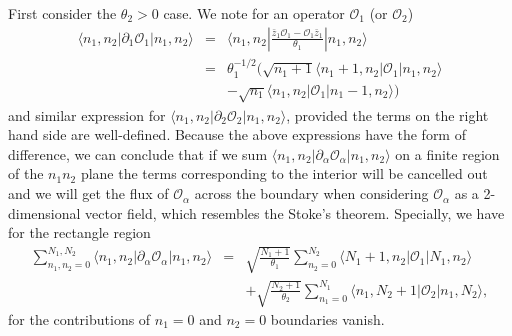 \documentclass[a4paper,a4paper]{article}
\begin{document}
First consider the $\theta _{2}>0$ case. We note for an operator
$\mathcal{O}_{1}$ (or $\mathcal{O}_{2}$)
\begin{eqnarray}
\langle n_{1},n_{2}|\partial _{1}\mathcal{O}_{1}|n_{1},n_{2}\rangle
&=&\langle n_{1},n_{2}|\frac{\bar{z}_{1}\mathcal{O}_{1}-\mathcal{O}_{1}\bar{z%
}_{1}}{\theta _{1}}|n_{1},n_{2}\rangle  \nonumber \\
&=&\theta _{1}^{-1/2}(\sqrt{n_{1}+1}\langle n_{1}+1,n_{2}|\mathcal{O}%
_{1}|n_{1},n_{2}\rangle \label{diff2}\\
&&-\sqrt{n_{1}}\langle n_{1},n_{2}|\mathcal{O}_{1}|n_{1}-1,n_{2}\rangle)
\nonumber
\end{eqnarray}%
and similar expression for $\langle n_{1},n_{2}|\partial _{2}\mathcal{O}%
_{2}|n_{1},n_{2}\rangle $, provided the terms on the right hand
side are well-defined. Because the above expressions have the form
of difference, we can conclude that if we sum $\langle
n_{1},n_{2}|\partial _{\alpha }\mathcal{O}_{\alpha
}|n_{1},n_{2}\rangle $ on a finite region of the $n_{1}n_{2}$
plane the terms corresponding to the interior will be cancelled
out and we will get the flux of $\mathcal{O}_{\alpha }$ across the
boundary when considering $\mathcal{O}_{\alpha }$ as a
2-dimensional vector field, which resembles the Stoke's theorem.
Specially, we have for the
rectangle region%
\begin{eqnarray}
\sum_{n_{1},n_{2}=0}^{N_{1},N_{2}}\langle n_{1},n_{2}|\partial _{\alpha }%
\mathcal{O}_{\alpha }|n_{1},n_{2}\rangle &=&\sqrt{\frac{N_{1}+1}{\theta _{1}}%
}\sum_{n_{2}=0}^{N_{2}}\langle N_{1}+1,n_{2}|\mathcal{O}_{1}|N_{1},n_{2}%
\rangle  \label{Stokes} \\
&&+\sqrt{\frac{N_{2}+1}{\theta _{2}}}\sum_{n_{1}=0}^{N_{1}}\langle
n_{1},N_{2}+1|\mathcal{O}_{2}|n_{1},N_{2}\rangle ,  \nonumber
\end{eqnarray}%
for the contributions of $n_{1}=0$ and $n_{2}=0$ boundaries vanish.
\end{document}
